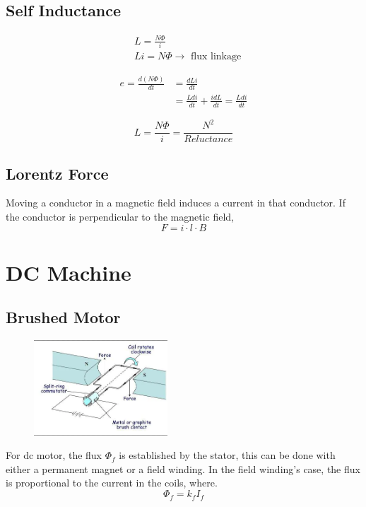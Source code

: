 \documentclass{article}
\begin{document}
    \subsection*{Self Inductance}
    \begin{align*}
        &L = \frac{N\Phi}{i}\\
        &Li = N\Phi \rightarrow \text{ flux linkage}
    \end{align*}

    \begin{align*}
        e = \frac{d(N\Phi)}{dt} &= \frac{dLi}{dt}\\
        & = \frac{Ldi}{dt} + \frac{idL}{dt} = \frac{Ldi}{dt}
    \end{align*}

    \begin{equation*}
        L = \frac{N \Phi }{i} = \frac{N^2}{Reluctance}
    \end{equation*}

    \subsection*{Lorentz Force}
    Moving a conductor in a magnetic field induces a current in that conductor.
    If the conductor is perpendicular to the magnetic field,
    \begin{equation*}
        F = i \cdot l \cdot B
    \end{equation*}


    \section*{DC Machine}
    \subsection*{Brushed Motor}

    \begin{figure}[H]
            \centering
            \includegraphics[width=5cm]{figures/brushed_motor.png}
    \end{figure}
    For dc motor, the flux $\Phi_{f}$ is established by the stator, this can be done with either a 
    permanent magnet or a field winding. In the field winding's case, the flux is proportional to 
    the current in the coils, where.
    \begin{equation*}
        \Phi_{f} = k_{f} I_{f}
    \end{equation*}
\end{document}
